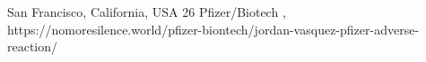           {San Francisco, California, USA}
          {26}
          {Pfizer/Biotech}
          {}
          {
            ,
          }
          {https://nomoresilence.world/pfizer-biontech/jordan-vasquez-pfizer-adverse-reaction/}

